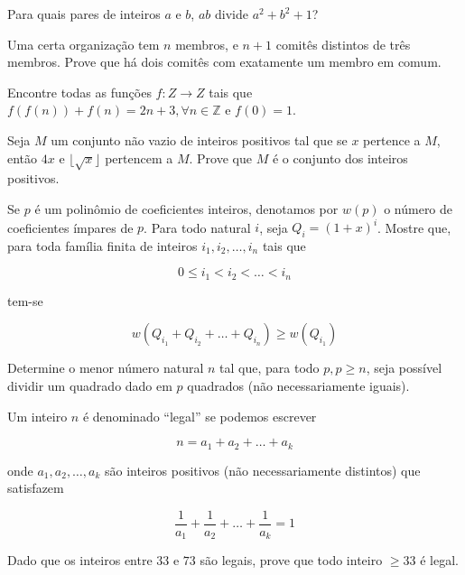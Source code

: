\begin{questao}
  Para quais pares de inteiros $a$ e $b$, $ab$ divide $a^2+b^2+1$?
\end{questao}

\begin{questao}
  Uma certa organização tem $n$ membros, e $n+1$ comitês distintos de três
  membros. Prove que há dois comitês com exatamente um membro em comum.
\end{questao}

\begin{questao}
  Encontre todas as funções $f: Z \rightarrow Z$ tais que $f(f(n))+f(n) = 2n+3,
  \forall n \in \mathbb{Z}$ e $f(0) = 1$.
\end{questao}

\begin{questao}
  Seja $M$ um conjunto não vazio de inteiros positivos tal que se $x$ pertence a
  $M$, então $4x$ e $\lfloor \sqrt{x} \rfloor$ pertencem a $M$. Prove que $M$ é
  o conjunto dos inteiros positivos.
\end{questao}

\begin{questao}
  Se $p$ é um polinômio de coeficientes inteiros, denotamos por $w(p)$ o número
  de coeficientes ímpares de $p$. Para todo natural $i$, seja
  $Q_i=(1+x)^i$. Mostre que, para toda família finita de inteiros
  $i_1,i_2,\ldots,i_n$ tais que

  $$ 0 \leq i_1 < i_2 < \ldots < i_n $$

  tem-se

  $$ w(Q_{i_1}+Q_{i_2}+\ldots +Q_{i_n}) \geq w(Q_{i_1}) $$
\end{questao}

\begin{questao}
  Determine o menor número natural $n$ tal que, para todo $p,p \geq n$, seja
  possível dividir um quadrado dado em $p$ quadrados (não necessariamente
  iguais).
\end{questao}

\begin{questao}
  Um inteiro $n$ é denominado ``legal'' se podemos escrever

  $$ n = a_1+a_2+\ldots+a_k$$

  onde $a_1,a_2,\ldots,a_k$ são inteiros positivos (não necessariamente
  distintos) que satisfazem

  $$ \frac{1}{a_1}+\frac{1}{a_2}+\ldots+\frac{1}{a_k}=1$$

  Dado que os inteiros entre $33$ e $73$ são legais, prove que todo inteiro
  $\geq 33$ é legal.
\end{questao}

